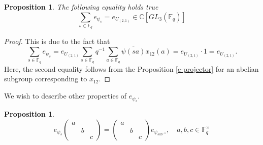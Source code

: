 \documentclass[12pt,reqno]{amsart}
\newtheorem{prop}[thm]{Proposition}
\theoremstyle{definition}
\newtheorem{defn}[thm]{Definition}
\theoremstyle{remark}
\numberwithin{equation}{section}
\newcommand{\CC}{\mathbb{C}}
\newcommand{\GL}[1]{GL_{#1}(\mathbb{F}_q)}
\begin{document}









\begin{prop}\label{sum_of_idempotents}
    The following equality holds true
    \[
    \sum_{s\in \mathbb{F}_q}e_{\psi_s} = e_{U_{(2,1)}}\in \CC[\GL{3}]
    \]
\end{prop}

\begin{proof}
    This is due to the fact that
    \[
    \sum_{s\in \mathbb{F}_q}e_{\psi_s}=e_{U_{(2,1)}}\sum_{s\in \mathbb{F}_q}q^{-1}\sum_{a\in \mathbb{F}_q}\overline{\psi(sa)}x_{12}(a)=e_{U_{(2,1)}}\cdot 1=e_{U_{(2,1)}}.
    \]
    Here, the second equality follows from the Proposition \ref{e-projector} for an abelian subgroup corresponding to $x_{12}$.
\end{proof}

We wish to describe other properties of $e_{\psi_s}$.

\begin{prop}\label{Epsi*N}
    \begin{equation*}
        e_{\psi_s}
        \begin{pmatrix}
            a & &\\
            & b &\\
            & & c
        \end{pmatrix} = 
        \begin{pmatrix}
            a & &\\
            & b &\\
            & & c
        \end{pmatrix}
        e_{\psi_{sab^{-1}}}, \quad a,b,c\in \mathbb{F}_q^{\times}
    \end{equation*}
\end{prop}
\end{document}
